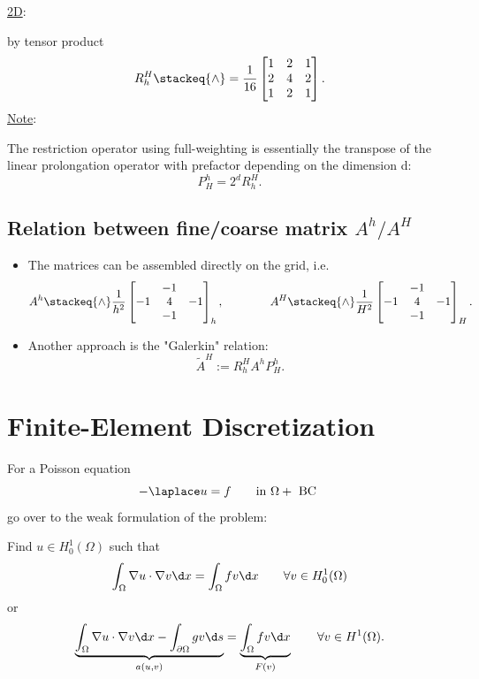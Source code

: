\begin{itemize}
		\underline{2D}:

		by tensor product
		\[
			R_{h}^{H}\stackeq{\wedge}=\frac{1}{16}\begin{bmatrix}
				1 & 2 & 1 \\
				2 & 4 & 2 \\
				1 & 2 & 1
			\end{bmatrix}
		.\] 
		\underline{Note}:

		The restriction operator using full-weighting is essentially the transpose of the linear prolongation operator with prefactor depending on the dimension d:
		\[
			P_{H}^{h} = 2^{d}R_{h}^{H}
		.\] 
\end{itemize}

\subsection{Relation between fine/coarse matrix $A^{h} / A^{H}$}%
\label{sec:Relation between fine/coarse matrix $A^{h} / A^{H}$}

\begin{itemize}
	\item The matrices can be assembled directly on the grid, i.e.
		\[
			A^{h} \stackeq{\wedge} \frac{1}{h^{2}}\begin{bmatrix}
			& -1 & \\
				-1 & 4 & -1 \\
				   & -1 & 
			\end{bmatrix}_{h},
			\qquad\qquad
			A^{H} \stackeq{\wedge} \frac{1}{H^{2}}\begin{bmatrix}
			& -1 & \\
				-1 & 4 & -1 \\
				& -1 & 
			\end{bmatrix}_{H}
		.\] 

	\item Another approach is the "Galerkin" relation:
		\[
		\tilde{A}^{H}:=R_{h}^{H}A^{h}P_{H}^{h}
		.\] 
\end{itemize}

\section{Finite-Element Discretization}%
\label{sec:Finite-Element Discretization}

For a Poisson equation
\[
- \laplace u = f \qquad \text{in }\Omega + \text{ BC }
\] 
go over to the weak formulation of the problem:

Find $u \in H_{0}^{1}(\Omega)$ such that
\[
	\int_{\Omega} \nabla u \cdot \nabla v \d x = \int_{\Omega} fv \d x \qquad \forall v \in H_{0}^{1}(\Omega )
\] 
or
\[
	\underbrace{ \int_{\Omega }\nabla u \cdot \nabla v \d x - \int_{\partial \Omega }gv \d s}_{a(u,v)} = \underbrace{ \int_{\Omega }fv \d x}_{F(v)} \qquad \forall v \in H^{1}(\Omega )
.\] 

